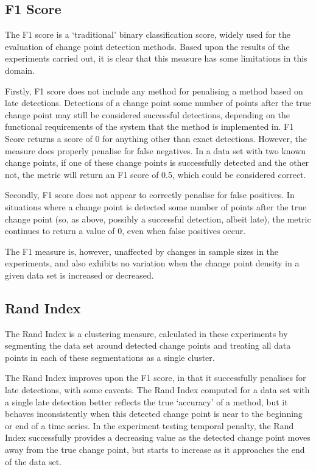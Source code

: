 \documentclass{uvamscse}	%
\begin{document}
\subsection{F1 Score}

The F1 score is a `traditional' binary classification score, widely used for the evaluation of change point detection methods. Based upon the results of the experiments carried out, it is clear that this measure has some limitations in this domain.

Firstly, F1 score does not include any method for penalising a method based on late detections. Detections of a change point some number of points after the true change point may still be considered successful detections, depending on the functional requirements of the system that the method is implemented in. F1 Score returns a score of 0 for anything other than exact detections. However, the measure does properly penalise for false negatives. In a data set with two known change points, if one of these change points is successfully detected and the other not, the metric will return an F1 score of 0.5, which could be considered correct.

Secondly, F1 score does not appear to correctly penalise for false positives. In situations where a change point is detected some number of points after the true change point (so, as above, possibly a successful detection, albeit late), the metric continues to return a value of 0, even when false positives occur.

The F1 measure is, however, unaffected by changes in sample sizes in the experiments, and also exhibits no variation when the change point density in a given data set is increased or decreased.

\subsection{Rand Index}

The Rand Index is a clustering measure, calculated in these experiments by segmenting the data set around detected change points and treating all data points in each of these segmentations as a single cluster.

The Rand Index improves upon the F1 score, in that it successfully penalises for late detections, with some caveats. The Rand Index computed for a data set with a single late detection better reflects the true `accuracy' of a method, but it behaves inconsistently when this detected change point is near to the beginning or end of a time series. In the experiment testing temporal penalty, the Rand Index successfully provides a decreasing value as the detected change point moves away from the true change point, but starts to increase as it approaches the end of the data set.
\end{document}
